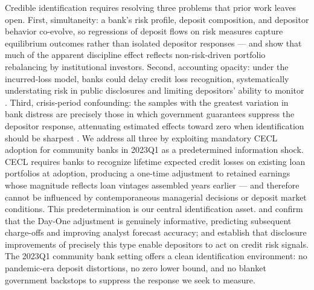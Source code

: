 Credible identification requires resolving three problems that prior work leaves
open. First, simultaneity: a bank's risk profile, deposit composition, and
depositor behavior co-evolve, so regressions of deposit flows on risk measures
capture equilibrium outcomes rather than isolated depositor responses --- and
\citet{covitz2004market} show that much of the apparent discipline effect reflects
non-risk-driven portfolio rebalancing by institutional investors. Second,
accounting opacity: under the incurred-loss model, banks could delay credit loss
recognition, systematically understating risk in public disclosures and limiting
depositors' ability to monitor \citep{bushman2012accounting,bushman2015delayed}.
Third, crisis-period confounding: the samples with the greatest variation in bank
distress are precisely those in which government guarantees suppress the depositor
response, attenuating estimated effects toward zero when identification should be
sharpest \citep{bennett2015market}. We address all three by exploiting mandatory
CECL adoption for community banks in 2023Q1 as a predetermined information shock.
CECL requires banks to recognize lifetime expected credit losses on existing loan
portfolios at adoption, producing a one-time adjustment to retained earnings whose
magnitude reflects loan vintages assembled years earlier --- and therefore cannot
be influenced by contemporaneous managerial decisions or deposit market conditions.
This predetermination is our central identification asset.
\citet{kim2026current} and \citet{gee2022decision} confirm that the Day-One
adjustment is genuinely informative, predicting subsequent charge-offs and
improving analyst forecast accuracy; \citet{nier2006market} and
\citet{chen2022bank} establish that disclosure improvements of precisely this type
enable depositors to act on credit risk signals. The 2023Q1 community bank setting
offers a clean identification environment: no pandemic-era deposit distortions, no
zero lower bound, and no blanket government backstops to suppress the response we
seek to measure.

